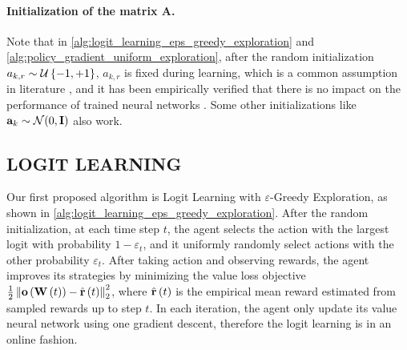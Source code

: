 \paragraph{Initialization of the matrix $\mathbf{A}$.} Note that in \cref{alg:logit_learning_eps_greedy_exploration} and \cref{alg:policy_gradient_uniform_exploration}, after the random initialization $a_{k,r} \sim {\mathcal{U}}\left\{-1, +1\right\}$, $a_{k,r}$ is fixed during learning, which is a common assumption in literature \citep{li2018learning,du2018gradientA,du2018gradientB,allen2018convergenceA,allen2018convergenceB}, and it has been empirically verified that there is no impact on the performance of trained neural networks \citep{hoffer2018fix}. Some other initializations like ${\mathbf{a}}_k \sim {\mathcal{N}}(0, {\mathbf{I}})$ also work.

\subsection{LOGIT LEARNING}
\label{subsec:logit_learning}

Our first proposed algorithm is Logit Learning with $\varepsilon$-Greedy Exploration, as shown in \cref{alg:logit_learning_eps_greedy_exploration}. After the random initialization, at each time step $t$, the agent selects the action with the largest logit with probability $1 - \varepsilon_t$, and it uniformly randomly select actions with the other probability $\varepsilon_t$. After taking action and observing rewards, the agent improves its strategies by minimizing the value loss objective $\frac{1}{2} \left\| {\mathbf{o}}\left( {\mathbf{W}}\left(t\right)\right) - \hat{{\mathbf{r}}}\left(t\right) \right\|_2^2$, where $\hat{{\mathbf{r}}}\left(t\right)$ is the empirical mean reward estimated from sampled rewards up to step $t$. In each iteration, the agent only update its value neural network using one gradient descent, therefore the logit learning is in an online fashion.


